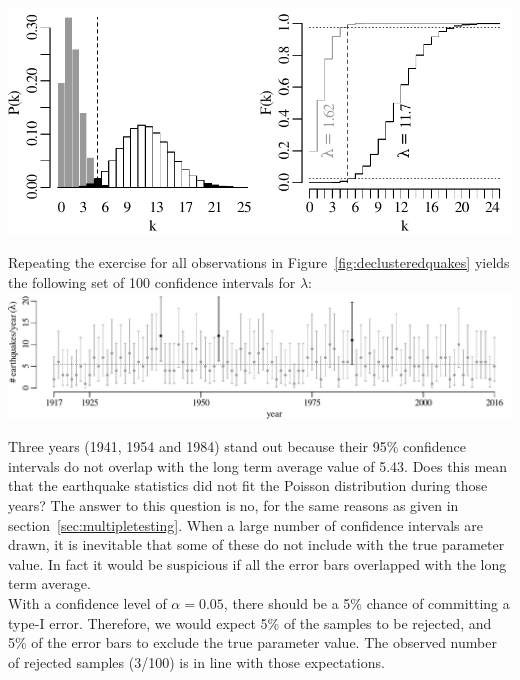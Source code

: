 \noindent\begin{minipage}[t][][b]{.6\textwidth}
  \includegraphics[width=\textwidth]{../figures/poisci.pdf}\\
\end{minipage}
\begin{minipage}[t][][t]{.4\textwidth}
  \label{fig:poisci}
\end{minipage}

Repeating the exercise for all observations in
Figure~\ref{fig:declusteredquakes} yields the following set of 100
confidence intervals for $\lambda$:\\

\noindent\includegraphics[width=\textwidth]{../figures/poiserrbars.pdf}
\begingroup {}  \endgroup

Three years (1941, 1954 and 1984) stand out because their 95\%
confidence intervals do not overlap with the long term average value
of 5.43. Does this mean that the earthquake statistics did not fit the
Poisson distribution during those years? The answer to this question
is no, for the same reasons as given in
section~\ref{sec:multipletesting}. When a large number of confidence
intervals are drawn, it is inevitable that some of these do not
include with the true parameter value. In fact it would be suspicious
if all the error bars overlapped with the long term average.\\

With a confidence level of $\alpha=0.05$, there should be a 5\%
chance of committing a type-I error.  Therefore, we would expect 5\%
of the samples to be rejected, and 5\% of the error bars to exclude
the true parameter value. The observed number of rejected samples
(3/100) is in line with those expectations.

